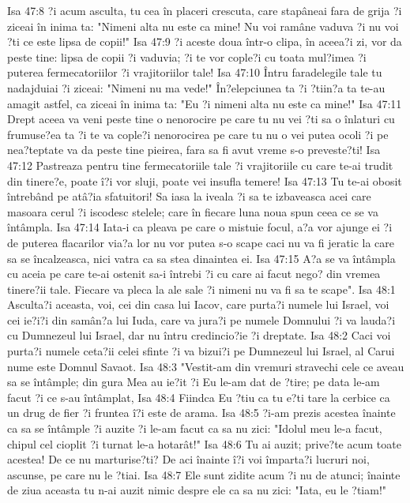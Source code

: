 Isa 47:8  ?i acum asculta, tu cea în placeri crescuta, care stapâneai fara de grija ?i ziceai în inima ta: "Nimeni alta nu este ca mine! Nu voi ramâne vaduva ?i nu voi ?ti ce este lipsa de copii!"
Isa 47:9  ?i aceste doua într-o clipa, în aceea?i zi, vor da peste tine: lipsa de copii ?i vaduvia; ?i te vor cople?i cu toata mul?imea ?i puterea fermecatoriilor ?i vrajitoriilor tale!
Isa 47:10  Întru faradelegile tale tu nadajduiai ?i ziceai: "Nimeni nu ma vede!" În?elepciunea ta ?i ?tiin?a ta te-au amagit astfel, ca ziceai în inima ta: "Eu ?i nimeni alta nu este ca mine!"
Isa 47:11  Drept aceea va veni peste tine o nenorocire pe care tu nu vei ?ti sa o înlaturi cu frumuse?ea ta ?i te va cople?i nenorocirea pe care tu nu o vei putea ocoli ?i pe nea?teptate va da peste tine pieirea, fara sa fi avut vreme s-o preveste?ti!
Isa 47:12  Pastreaza pentru tine fermecatoriile tale ?i vrajitoriile cu care te-ai trudit din tinere?e, poate î?i vor sluji, poate vei insufla temere!
Isa 47:13  Tu te-ai obosit întrebând pe atâ?ia sfatuitori! Sa iasa la iveala ?i sa te izbaveasca acei care masoara cerul ?i iscodesc stelele; care în fiecare luna noua spun ceea ce se va întâmpla.
Isa 47:14  Iata-i ca pleava pe care o mistuie focul, a?a vor ajunge ei ?i de puterea flacarilor via?a lor nu vor putea s-o scape caci nu va fi jeratic la care sa se încalzeasca, nici vatra ca sa stea dinaintea ei.
Isa 47:15  A?a se va întâmpla cu aceia pe care te-ai ostenit sa-i întrebi ?i cu care ai facut nego? din vremea tinere?ii tale. Fiecare va pleca la ale sale ?i nimeni nu va fi sa te scape".
Isa 48:1  Asculta?i aceasta, voi, cei din casa lui Iacov, care purta?i numele lui Israel, voi cei ie?i?i din samân?a lui Iuda, care va jura?i pe numele Domnului ?i va lauda?i cu Dumnezeul lui Israel, dar nu întru credincio?ie ?i dreptate.
Isa 48:2  Caci voi purta?i numele ceta?ii celei sfinte ?i va bizui?i pe Dumnezeul lui Israel, al Carui nume este Domnul Savaot.
Isa 48:3  "Vestit-am din vremuri stravechi cele ce aveau sa se întâmple; din gura Mea au ie?it ?i Eu le-am dat de ?tire; pe data le-am facut ?i ce s-au întâmplat,
Isa 48:4  Fiindca Eu ?tiu ca tu e?ti tare la cerbice ca un drug de fier ?i fruntea î?i este de arama.
Isa 48:5  ?i-am prezis acestea înainte ca sa se întâmple ?i auzite ?i le-am facut ca sa nu zici: "Idolul meu le-a facut, chipul cel cioplit ?i turnat le-a hotarât!"
Isa 48:6  Tu ai auzit; prive?te acum toate acestea! De ce nu marturise?ti? De aci înainte î?i voi împarta?i lucruri noi, ascunse, pe care nu le ?tiai.
Isa 48:7  Ele sunt zidite acum ?i nu de atunci; înainte de ziua aceasta tu n-ai auzit nimic despre ele ca sa nu zici: "Iata, eu le ?tiam!"
